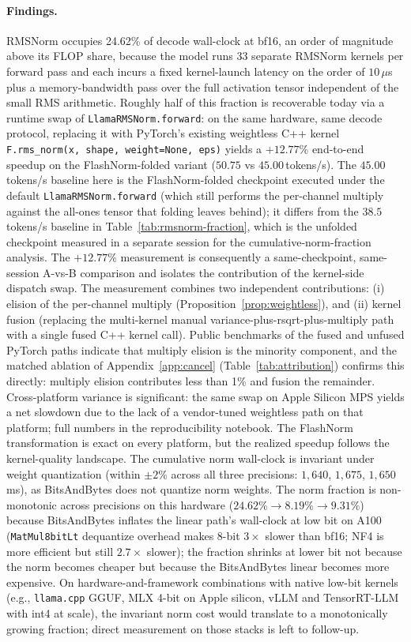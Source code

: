 \documentclass{article}
\begin{document}
\paragraph{Findings.} RMSNorm occupies 24.62\% of decode wall-clock at bf16, an order of magnitude above its FLOP share, because the model runs 33 separate RMSNorm kernels per forward pass and each incurs a fixed kernel-launch latency on the order of $10\,\mu$s plus a memory-bandwidth pass over the full activation tensor independent of the small RMS arithmetic. Roughly half of this fraction is recoverable today via a runtime swap of \texttt{LlamaRMSNorm.forward}: on the same hardware, same decode protocol, replacing it with PyTorch's existing weightless C++ kernel \texttt{F.rms\_norm(x, shape, weight=None, eps)} yields a $\mathbf{+12.77\%}$ end-to-end speedup on the FlashNorm-folded variant
($50.75$ vs $45.00$\,tokens/s).
The $45.00$\,tokens/s baseline here is the FlashNorm-folded checkpoint executed under the default \texttt{LlamaRMSNorm.forward} (which still performs the per-channel multiply against the all-ones tensor that folding leaves behind); it differs from the $38.5$\,tokens/s baseline in Table~\ref{tab:rmsnorm-fraction}, which is the unfolded checkpoint measured in a separate session for the cumulative-norm-fraction analysis. The $+12.77\%$ measurement is consequently a same-checkpoint, same-session A-vs-B comparison and isolates the contribution of the kernel-side dispatch swap. The measurement combines two independent contributions: (i) elision of the per-channel multiply (Proposition~\ref{prop:weightless}), and (ii) kernel fusion (replacing the multi-kernel manual variance-plus-rsqrt-plus-multiply path with a single fused C++ kernel call). Public benchmarks of the fused and unfused PyTorch paths indicate that multiply elision is the minority component, and the matched ablation of Appendix~\ref{app:cancel} (Table~\ref{tab:attribution}) confirms this directly: multiply elision contributes less than 1\% and fusion the remainder. Cross-platform variance is significant: the same swap on Apple Silicon MPS yields a net slowdown due to the lack of a vendor-tuned weightless path on that platform; full numbers in the reproducibility notebook. The FlashNorm transformation is exact on every platform, but the realized speedup follows the kernel-quality landscape.
The cumulative norm wall-clock is invariant under weight quantization (within $\pm 2\%$ across all three precisions: $1{,}640$, $1{,}675$, $1{,}650$\,ms), as BitsAndBytes does not quantize norm weights. The norm fraction is non-monotonic across precisions on this hardware ($24.62\% \to 8.19\% \to 9.31\%$) because BitsAndBytes inflates the linear path's wall-clock at low bit on A100 (\texttt{MatMul8bitLt} dequantize overhead makes 8-bit $3\times$ slower than bf16; NF4 is more efficient but still $2.7\times$ slower); the fraction shrinks at lower bit not because the norm becomes cheaper but because the BitsAndBytes linear becomes more expensive. On hardware-and-framework combinations with native low-bit kernels (e.g., \texttt{llama.cpp} GGUF, MLX 4-bit on Apple silicon, vLLM and TensorRT-LLM with int4 at scale), the invariant norm cost would translate to a monotonically growing fraction; direct measurement on those stacks is left to follow-up.
\end{document}
